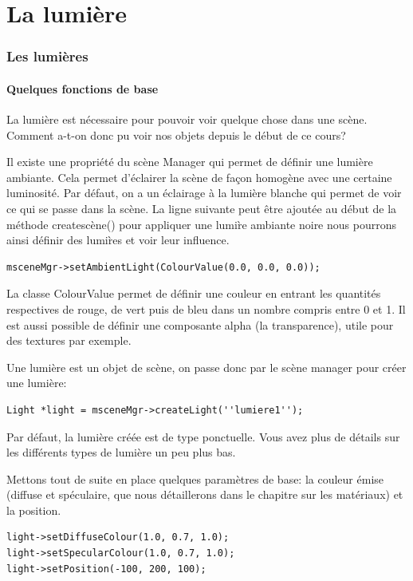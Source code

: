 \documentclass[10pt,a4paper]{report}
\begin{document}
\part{La lumi\`ere}



\section{Les lumi\`eres}


\subsection{Quelques fonctions de base}

La lumi\`ere est n\'ecessaire pour pouvoir voir quelque chose dans une sc\`ene. Comment a-t-on donc pu voir nos objets depuis le d\'ebut de ce cours?

Il existe une propri\'et\'e du sc\`ene Manager qui permet de d\'efinir une lumi\`ere ambiante. Cela permet d'\'eclairer la sc\`ene de fa\c{c}on homog\`ene avec une certaine luminosit\'e. Par d\'efaut, on a un \'eclairage \`{a} la lumi\`ere blanche qui permet de voir ce qui se passe dans la sc\`ene. La ligne suivante peut \^etre ajout\'ee au d\'ebut de la m\'ethode createsc\`ene() pour appliquer une lumi\`re ambiante noire nous pourrons ainsi d\'efinir des lumi\`res et voir leur influence.

\begin{lstlisting}
msceneMgr->setAmbientLight(ColourValue(0.0, 0.0, 0.0));
\end{lstlisting}



La classe ColourValue permet de d\'efinir une couleur en entrant les quantit\'es respectives de rouge, de vert puis de bleu dans un nombre compris entre 0 et 1. Il est aussi possible de d\'efinir une composante alpha (la transparence), utile pour des textures par exemple.

Une lumi\`ere est un objet de sc\`ene, on passe donc par le sc\`ene manager pour cr\'eer une lumi\`ere:
\begin{lstlisting}
Light *light = msceneMgr->createLight(''lumiere1'');
\end{lstlisting}

Par d\'efaut, la lumi\`ere cr\'e\'ee est de type ponctuelle. Vous avez plus de d\'etails sur les diff\'erents types de lumi\`ere un peu plus bas.

Mettons tout de suite en place quelques param\`etres de base: la couleur \'emise (diffuse et sp\'eculaire, que nous d\'etaillerons dans le chapitre sur les mat\'eriaux) et la position.
\begin{lstlisting}
light->setDiffuseColour(1.0, 0.7, 1.0);
light->setSpecularColour(1.0, 0.7, 1.0);
light->setPosition(-100, 200, 100);
\end{lstlisting}
\end{document}
